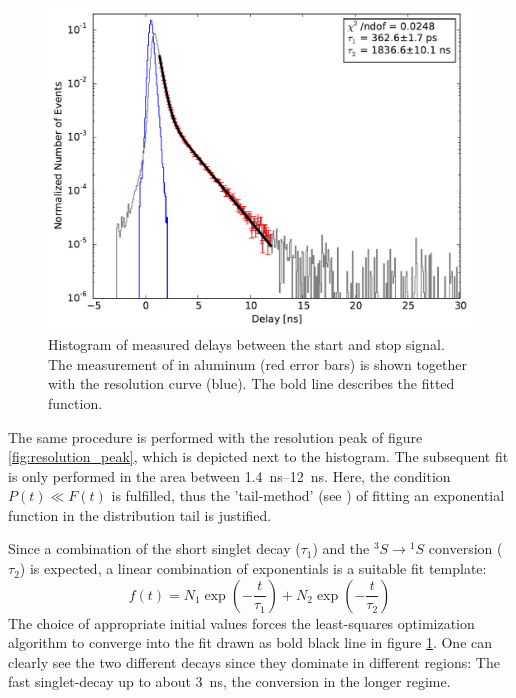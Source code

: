 \documentclass[
	paper=A4,
	parskip=full,
	chapterprefix=true,
	11pt,
	headings=normal,
	bibliography=totoc,
	listof=totoc,
	titlepage=on,
]{scrreprt}
\begin{document}
\begin{figure}
	\centering
	\includegraphics{na22_polyethylen}
	\caption{Histogram of measured delays between the start and stop signal. The measurement of  in aluminum (red error bars) is shown together with the resolution curve (blue). The bold line describes the fitted function.}
	\label{fig:Na22_poly}
\end{figure}

The same procedure is performed with the resolution peak of figure \ref{fig:resolution_peak}, which is depicted next to the histogram. The subsequent fit is only performed in the area between \SIrange{1.4}{12}{\nano\second}. Here, the condition $P(t) \ll F(t)$ is fulfilled, thus the 'tail-method' (see \cite{Lab_manual_T8}) of fitting an exponential function in the distribution tail is justified.

Since a combination of the short singlet decay ($\tau_1$) and the ${^3S} \rightarrow {^1S}$ conversion ($\tau_2$) is expected, a linear combination of exponentials is a suitable fit template:
\begin{equation}
	f(t) = N_1 \exp(-\frac{t}{\tau_1}) + N_2 \exp(-\frac{t}{\tau_2})
	\label{eq:plastic_fit}
\end{equation}
The choice of appropriate initial values forces the least-squares optimization algorithm to converge into the fit drawn as bold black line in figure \ref{fig:Na22_poly}. One can clearly see the two different decays since they dominate in different regions: The fast singlet-decay up to about \SI{3}{\nano\second}, the conversion in the longer regime.
\end{document}
